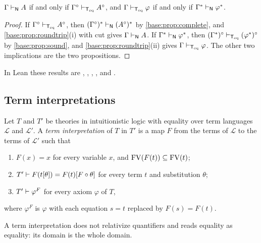 \begin{corollary}
\label{base:cor:nteq}
$\Gamma\vdash_{\mathsf{N}}A$ if and only if $\Gamma^\circ\vdash_{\mathsf{T}_{\mathrm{eq}}}A^\circ$,
and $\Gamma\vdash_{\mathsf{T}_{\mathrm{eq}}}\varphi$ if and only if
$\Gamma^{*}\vdash_{\mathsf{N}}\varphi^{*}$.
\end{corollary}

\begin{proof}
If $\Gamma^\circ\vdash_{\mathsf{T}_{\mathrm{eq}}}A^\circ$, then
$(\Gamma^\circ)^{*}\vdash_{\mathsf{N}}(A^\circ)^{*}$ by
\cref{base:prop:complete}, and \cref{base:prop:roundtrip}(i) with cut
gives $\Gamma\vdash_{\mathsf{N}}A$.  If $\Gamma^{*}\vdash_{\mathsf{N}}\varphi^{*}$,
then $(\Gamma^{*})^\circ\vdash_{\mathsf{T}_{\mathrm{eq}}}(\varphi^{*})^\circ$ by
\cref{base:prop:sound}, and \cref{base:prop:roundtrip}(ii) gives
$\Gamma\vdash_{\mathsf{T}_{\mathrm{eq}}}\varphi$.  The other two implications are the two
propositions.
\end{proof}

In Lean these results are , ,
, , 
and .

\subsection{Term interpretations}

\begin{definition}
\label{base:def:interp}
Let $T$ and $T'$ be theories in intuitionistic logic with equality over term
languages $\mathcal L$ and $\mathcal L'$.  A \emph{term interpretation} of
$T$ in $T'$ is a map $F$ from the terms of $\mathcal L$ to the terms of
$\mathcal L'$ such that
\begin{enumerate}[label=\textup{(\roman*)}]
\item $F(x)=x$ for every variable $x$, and $\operatorname{FV}(F(t))\subseteq\operatorname{FV}(t)$;
\item $T'\vdash F(t[\theta])=F(t)[F\circ\theta]$ for every term $t$ and
 substitution $\theta$;
\item $T'\vdash\varphi^{F}$ for every axiom $\varphi$ of $T$,
\end{enumerate}
where $\varphi^{F}$ is $\varphi$ with each equation $s=t$ replaced by
$F(s)=F(t)$.
\end{definition}

A term interpretation does not relativize quantifiers and reads equality as
equality: its domain is the whole domain.

